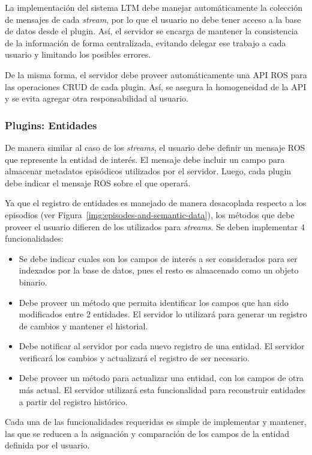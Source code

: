 La implementación del sistema LTM debe manejar automáticamente la colección de mensajes de cada \textit{stream}, por lo que el usuario no debe tener acceso a la base de datos desde el plugin. Así, el servidor se encarga de mantener la consistencia de la información de forma centralizada, evitando delegar ese trabajo a cada usuario y limitando los posibles errores.

De la misma forma, el servidor debe proveer automáticamente una API ROS para las operaciones CRUD de cada plugin. Así, se asegura la homogeneidad de la API y se evita agregar otra responsabilidad al usuario. 


\subsubsection{Plugins: Entidades}

De manera similar al caso de los \textit{streams}, el usuario debe definir un mensaje ROS que represente la entidad de interés. El mensaje debe incluir un campo para almacenar metadatos episódicos utilizados por el servidor. Luego, cada plugin debe indicar el mensaje ROS sobre el que operará.

Ya que el registro de entidades es manejado de manera desacoplada respecto a los episodios (ver Figura~\ref{img:episodes-and-semantic-data}), los métodos que debe proveer el usuario difieren de los utilizados para \textit{streams}. Se deben implementar 4 funcionalidades:
\begin{itemize}
\item Se debe indicar cuales son los campos de interés a ser considerados para ser indexados por la base de datos, pues el resto es almacenado como un objeto binario.
\item Debe proveer un método que permita identificar los campos que han sido modificados entre 2 entidades. El servidor lo utilizará para generar un registro de cambios y mantener el historial.
\item Debe notificar al servidor por cada nuevo registro de una entidad. El servidor verificará los cambios y actualizará el registro de ser necesario.
\item Debe proveer un método para actualizar una entidad, con los campos de otra más actual. El servidor utilizará esta funcionalidad para reconstruir entidades a partir del registro histórico.
\end{itemize}
Cada una de las funcionalidades requeridas es simple de implementar y mantener, las que se reducen a la asignación y comparación de los campos de la entidad definida por el usuario.

